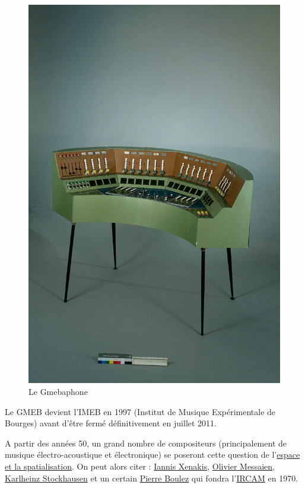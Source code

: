 \documentclass[
  letterpaper,
  DIV=11,
  numbers=noendperiod]{scrreprt}
\begin{document}
\begin{figure}

{\centering \includegraphics{spatialisation/../_resources/bitmap/various/gmebaphone.jpeg}

}

\caption{Le Gmebaphone}

\end{figure}

Le GMEB devient l'IMEB en 1997 (Institut de Musique Expérimentale de
Bourges) avant d'être fermé définitivement en juillet 2011.

A partir des années 50, un grand nombre de compositeurs (principalement
de musique électro-acoustique et électronique) se poseront cette
question de
l'\href{http://sonhors.free.fr/panorama/sonhors13.htm}{espace et la
spatialisation}. On peut alors citer :
\href{https://fr.wikipedia.org/wiki/Iannis_Xenakis}{Iannis Xenakis},
\href{https://fr.wikipedia.org/wiki/Olivier_Messiaen}{Olivier Messaien},
\href{https://fr.wikipedia.org/wiki/Karlheinz_Stockhausen}{Karlheinz
Stockhausen} et un certain
\href{https://fr.wikipedia.org/wiki/Pierre_Boulez}{Pierre Boulez} qui
fondra l'\href{http://www.ircam.fr/}{IRCAM} en 1970.
\end{document}
